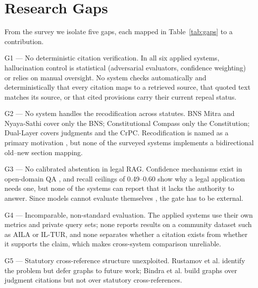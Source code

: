 \documentclass[conference]{IEEEtran}
\begin{document}
\section{Research Gaps}

From the survey we isolate five gaps, each mapped in Table~\ref{tab:gaps} to a contribution.

G1 --- No deterministic citation verification. In all six applied systems, hallucination control is statistical (adversarial evaluators, confidence weighting) or relies on manual oversight. No system checks automatically and deterministically that every citation maps to a retrieved source, that quoted text matches its source, or that cited provisions carry their current repeal status.

G2 --- No system handles the recodification across statutes. BNS Mitra and Nyaya-Sathi cover only the BNS; Constitutional Compass only the Constitution; Dual-Layer covers judgments and the CrPC. Recodification is named as a primary motivation \cite{dixit2025}, but none of the surveyed systems implements a bidirectional old--new section mapping.

G3 --- No calibrated abstention in legal RAG. Confidence mechanisms exist in open-domain QA \cite{sun2025}, and recall ceilings of 0.49--0.60 \cite{rustamov2025} show why a legal application needs one, but none of the systems can report that it lacks the authority to answer. Since models cannot evaluate themselves \cite{dahl2024}, the gate has to be external.

G4 --- Incomparable, non-standard evaluation. The applied systems use their own metrics and private query sets; none reports results on a community dataset such as AILA or IL-TUR, and none separates whether a citation exists from whether it supports the claim, which makes cross-system comparison unreliable.

G5 --- Statutory cross-reference structure unexploited. Rustamov et al. identify the problem but defer graphs to future work; Bindra et al. build graphs over judgment citations but not over statutory cross-references.
\end{document}
